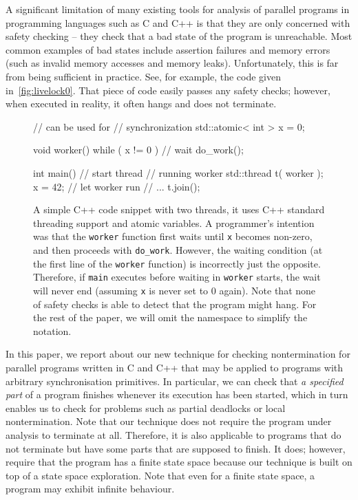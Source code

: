 A significant limitation of many existing tools for analysis of parallel
programs in programming languages such as C and C++ is that they are only concerned with safety checking -- they check that a bad state of the program is unreachable.
Most common examples of bad states include assertion failures and memory errors (such as invalid memory accesses and memory leaks).
Unfortunately, this is far from being sufficient in practice.
See, for example, the code given in~\autoref{fig:livelock0}.
That piece of code easily passes any safety checks; however, when executed in reality, it often hangs and does not terminate.

\begin{figure}[t]
\begin{minipage}[t]{0.49\textwidth}
\begin{cppcode}
    // can be used for
	// synchronization
    std::atomic< int > x = 0;

    void worker() {
      while ( x != 0 ) { } // wait
      do_work();
    }
\end{cppcode}
\end{minipage}
\hfill%
\begin{minipage}[t]{0.49\textwidth}
\begin{cppcode}
    int main() {
      // start thread
	  // running worker
      std::thread t( worker );
      x = 42; // let worker run
      // ...
      t.join();
    }
\end{cppcode}
\end{minipage}
\caption{
A simple C++ code snippet with two threads, it uses C++ standard threading support and atomic variables.
A programmer's intention was that the \texttt{worker} function first waits until \texttt{x}
becomes non-zero, and then proceeds with \texttt{do\_work}. However, the waiting
condition (at the first line of the \texttt{worker} function) is incorrectly just the
opposite. Therefore, if \texttt{main} executes  before waiting in \texttt{worker} starts, the wait will never end (assuming \texttt{x} is never set to 0 again).
Note that none of safety checks is able to detect that the program might hang.
For the rest of the paper, we will omit the  namespace to
simplify the notation.
}\label{fig:livelock0}
\end{figure}

In this paper, we report about our new technique for checking nontermination for parallel programs written in C and C++ that may be applied to programs with arbitrary synchronisation primitives.
In particular, we can check that \emph{a specified part} of a program finishes
whenever its execution has been started, which in turn enables us to check for problems such as partial deadlocks or local nontermination.
Note that our technique does not require the program under analysis to terminate at all.
Therefore, it is also applicable to programs that do not terminate but have some
parts that are supposed to finish.
It does; however, require that the program has a finite state space because our
technique is built on top of a state space exploration. Note that even for a finite state space, a program may exhibit infinite behaviour.

